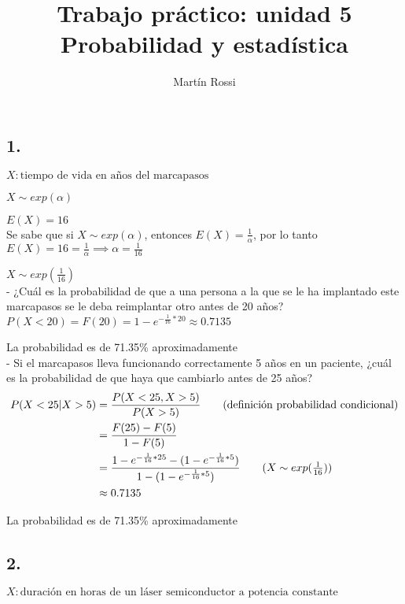 \documentclass[12pt,fleqn]{article}
\title{\LARGE \textbf{Trabajo práctico: unidad 5}\\\large Probabilidad y estadística}
\author{Martín Rossi}
\date{}
\begin{document}
\maketitle
\subsection*{1.}

$X: \textrm{tiempo de vida en años del marcapasos}$

$X \sim exp(\alpha)$

$E(X)=16$\\

Se sabe que si $X \sim exp(\alpha)$, entonces $E(X)=\frac{1}{\alpha}$, por lo tanto $E(X)=16=\frac{1}{\alpha}\implies \alpha=\frac{1}{16}$

$X \sim exp(\frac{1}{16})$\\

- ¿Cuál es la probabilidad de que a una persona a la que se le ha implantado este marcapasos se le deba reimplantar otro antes de 20 años?\\

$P(X<20)=F(20)=1-e^{-\frac{1}{16}*20} \approx 0.7135$

La probabilidad es de 71.35\% aproximadamente\\

- Si el marcapasos lleva funcionando correctamente 5 años en un paciente, ¿cuál es la probabilidad de que haya que cambiarlo antes de 25 años?\\
\begin{align*}
  P(X<25|X>5)&=\frac{P(X<25,X>5)}{P(X>5)}\tag{definición probabilidad condicional}\\
             &=\frac{F(25)-F(5)}{1-F(5)}\\
             &=\frac{1-e^{-\frac{1}{16}*25}-(1-e^{-\frac{1}{16}*5})}{1-(1-e^{-\frac{1}{16}*5})}\tag{$X \sim exp(\frac{1}{16})$}\\
             &\approx 0.7135
\end{align*}

La probabilidad es de 71.35\% aproximadamente
\newpage
\subsection*{2.}

$X: \textrm{duración en horas de un láser semiconductor a potencia constante}$\\
\end{document}
